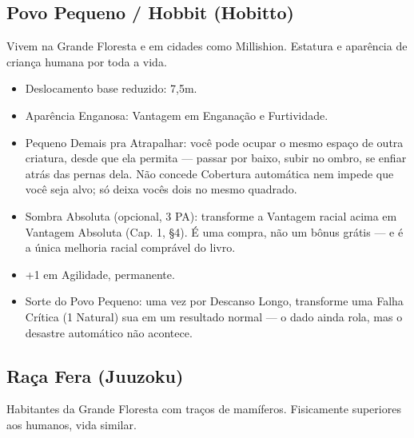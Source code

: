\subsection{Povo Pequeno / Hobbit (Hobitto)}
Vivem na Grande Floresta e em cidades como Millishion. Estatura e aparência de criança humana por toda a vida.

\begin{itemize}
  \item Deslocamento base reduzido: 7,5m.
  \item Aparência Enganosa: Vantagem em Enganação e Furtividade.
  \item Pequeno Demais pra Atrapalhar: você pode ocupar o mesmo espaço de outra criatura, desde que ela permita --- passar por baixo, subir no ombro, se enfiar atrás das pernas dela. Não concede Cobertura automática nem impede que você seja alvo; só deixa vocês dois no mesmo quadrado.
  \item Sombra Absoluta (opcional, 3 PA): transforme a Vantagem racial acima em Vantagem Absoluta (Cap. 1, §4). É uma compra, não um bônus grátis --- e é a única melhoria racial comprável do livro.
  \item +1 em Agilidade, permanente.
  \item Sorte do Povo Pequeno: uma vez por Descanso Longo, transforme uma Falha Crítica (1 Natural) sua em um resultado normal --- o dado ainda rola, mas o desastre automático não acontece.
\end{itemize}

\subsection{Raça Fera (Juuzoku)}
Habitantes da Grande Floresta com traços de mamíferos. Fisicamente superiores aos humanos, vida similar.

